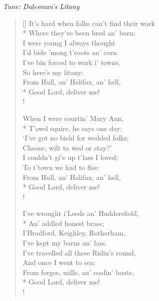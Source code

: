 \documentclass[MAIN]{subfiles}
\begin{document}
\bigskip

\begin{center}
{\it Tune: Dalesman's Litany}
\end{center}

\bigskip

\settowidth{\versewidth}{It's hard when folks can't find their work}
\begin{verse}[\versewidth]
It's hard when folks can't find their work\\*
\vin Where they've been bred an' born;\\
I were young I always thought\\
\vin I'd bide 'mong t'roots an' corn.\\
I've bin forced to work i' towns,\\
\vin So here's my litany:\\
From {\sc Hull}, an' {\sc Halifax}, an' hell,\\*
\vin Good Lord, deliver me!\\!

When I were courtin' Mary Ann,\\*
\vin T'owd squire, he says one day:\\
`I've got no bield for wedded folks;\\
\vin Choose, wilt ta wed or stay?'\\
I couldn't gi'e up t'lass I loved;\\
\vin To t'town we had to flee:\\
From {\sc Hull}, an' {\sc Halifax}, an' hell,\\*
\vin Good Lord, deliver me!\\!

I've wrought i'{\sc Leeds} an' {\sc Huddersfield},\\*
\vin An' addled honest brass;\\
I'{\sc Bradford}, {\sc Keighley}, {\sc Rotherham},\\
\vin I've kept my barns an' lass.\\
I've travelled all three Ridin's round,\\
\vin And once I went to sea:\\
From forges, mills, an' coalin' boats,\\*
\vin Good Lord, deliver me!\\!


\end{verse}
\end{document}
